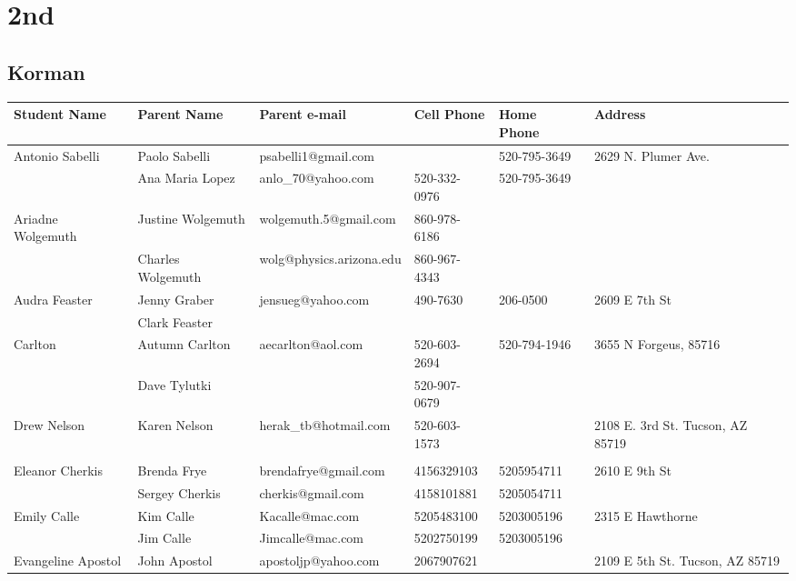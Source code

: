 \documentclass[landscape]{article}\usepackage[]{graphicx}\usepackage[]{color}
\begin{document}
\section{2nd}
\subsection{Korman}
\begin{longtable}{|p{100pt}|p{100pt}|p{140pt}|p{60pt}|p{64pt}|p{120pt}|}
\textbf{Student Name} & \textbf{Parent Name} & \textbf{Parent e-mail} & \textbf{Cell Phone} & \textbf{Home Phone} & \textbf{Address}\\
\hline
\hline
\multirow{2}{100pt}{Antonio Sabelli} & Paolo Sabelli & psabelli1@gmail.com &  & 520-795-3649 & \multirow{2}{120pt}{2629 N. Plumer Ave.} \\
 & Ana Maria Lopez & anlo\_70@yahoo.com & 520-332-0976 & 520-795-3649 & \\
\hline
\multirow{2}{100pt}{Ariadne Wolgemuth} & Justine Wolgemuth & wolgemuth.5@gmail.com & 860-978-6186 &  & \multirow{2}{120pt}{} \\
 & Charles Wolgemuth & wolg@physics.arizona.edu & 860-967-4343 &  & \\
\hline
\multirow{2}{100pt}{Audra Feaster} & Jenny Graber & jensueg@yahoo.com & 490-7630 & 206-0500 & \multirow{2}{120pt}{2609 E 7th St} \\
 & Clark Feaster &  &  &  & \\
\hline
\multirow{2}{100pt}{Carlton} & Autumn Carlton & aecarlton@aol.com & 520-603-2694 & 520-794-1946 & \multirow{2}{120pt}{3655 N Forgeus, 85716} \\
 & Dave Tylutki &  & 520-907-0679 &  & \\
\hline
\multirow{2}{100pt}{Drew Nelson} & Karen Nelson & herak\_tb@hotmail.com & 520-603-1573 &  & \multirow{2}{120pt}{2108 E. 3rd St. Tucson, AZ 85719} \\
 &  &  &  &  & \\
\hline
\multirow{2}{100pt}{Eleanor Cherkis} & Brenda Frye & brendafrye@gmail.com & 4156329103 & 5205954711 & \multirow{2}{120pt}{2610 E 9th St} \\
 & Sergey Cherkis & cherkis@gmail.com & 4158101881 & 5205054711 & \\
\hline
\multirow{2}{100pt}{Emily Calle} & Kim Calle & Kacalle@mac.com & 5205483100 & 5203005196 & \multirow{2}{120pt}{2315 E Hawthorne} \\
 & Jim Calle & Jimcalle@mac.com & 5202750199 & 5203005196 & \\
\hline
\multirow{2}{100pt}{Evangeline Apostol} & John Apostol & apostoljp@yahoo.com & 2067907621 &  & \multirow{2}{120pt}{2109 E 5th St. Tucson, AZ 85719} \\

\end{longtable}
\end{document}
